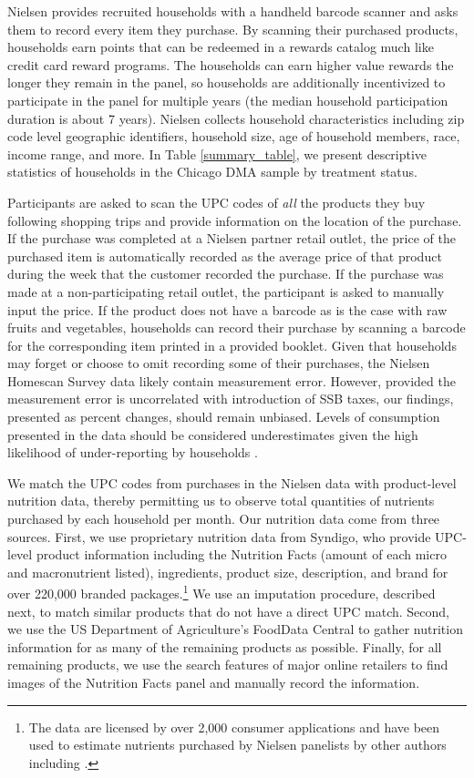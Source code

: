 \documentclass[12pt]{article}
\begin{document}
Nielsen provides recruited households with a handheld barcode scanner and asks them to record every item they purchase. By scanning their purchased products, households earn points that can be redeemed in a rewards catalog much like credit card reward programs. The households can earn higher value rewards the longer they remain in the panel, so households are additionally incentivized to participate in the panel for multiple years (the median household participation duration is about 7 years). Nielsen collects household characteristics including zip code level geographic identifiers, household size, age of household members, race, income range, and more. In Table \ref{summary_table}, we present descriptive statistics of households in the Chicago DMA sample by treatment status.

Participants are asked to scan the UPC codes of \textit{all} the products they buy following shopping trips and provide information on the location of the purchase. If the purchase was completed at a Nielsen partner retail outlet, the price of the purchased item is automatically recorded as the average price of that product during the week that the customer recorded the purchase. If the purchase was made at a non-participating retail outlet, the participant is asked to manually input the price. If the product does not have a barcode as is the case with raw fruits and vegetables, households can record their purchase by scanning a barcode for the corresponding item printed in a provided booklet. Given that households may forget or choose to omit recording some of their purchases, the Nielsen Homescan Survey data likely contain measurement error. However, provided the measurement error is uncorrelated with introduction of SSB taxes, our findings, presented as percent changes, should remain unbiased. Levels of consumption presented in the data should be considered underestimates given the high likelihood of under-reporting by households \parencite{einav2010recording}.

We match the UPC codes from purchases in the Nielsen data with product-level nutrition data, thereby permitting us to observe total quantities of nutrients purchased by each household per month. Our nutrition data come from three sources. First, we use proprietary nutrition data from Syndigo, who provide UPC-level product information including the Nutrition Facts (amount of each micro and macronutrient listed), ingredients, product size, description, and brand for over 220,000 branded packages.\footnote{The data are licensed by over 2,000 consumer applications and have been used to estimate nutrients purchased by Nielsen panelists by other authors including \textcite{dubois2014prices}.} We use an imputation procedure, described next, to match similar products that do not have a direct UPC match. Second, we use the US Department of Agriculture's FoodData Central to gather nutrition information for as many of the remaining products as possible. Finally, for all remaining products, we use the search features of major online retailers to find images of the Nutrition Facts panel and manually record the information.
\end{document}
